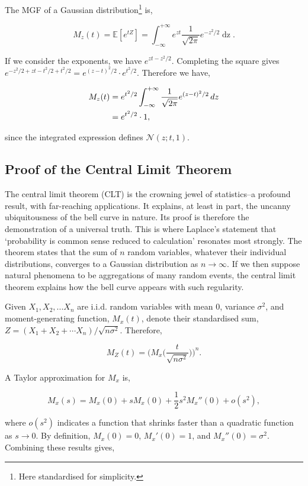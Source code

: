 \documentclass[11pt]{amsart}
\begin{document}
The MGF of a Gaussian distribution\footnote{Here standardised for simplicity.} is,

$$M_z(t) = \mathbb{E}[e^{tZ}] = \int_{-\infty}^{+\infty}e^{zt}\frac{1}{\sqrt{2\pi}}e^{-z^2/2}\mathop{dz}.$$

If we consider the exponents, we have $e^{zt - z^2/2}$. Completing the square gives $e^{-z^2/2 + zt - t^2/2 + t^2/2} = e^{(z-t)^2/2}\cdot e^{t^2/2}$. Therefore we have,

\begin{align}
M_z(t) &= e^{t^2/2}\int_{-\infty}^{+\infty}\frac{1}{\sqrt{2\pi}}e^{(z-t)^2/2}\mathop{dz} \notag \\
&= e^{t^2/2} \cdot 1, \notag
\end{align}

since the integrated expression defines $\mathcal{N}(z ; t, 1)$. 

\subsection{Proof of the Central Limit Theorem}

The central limit theorem (CLT) is the crowning jewel of statistics--a profound result, with far-reaching applications. It explains, at least in part, the uncanny ubiquitousness of the bell curve in nature. Its proof is therefore the demonstration of a universal truth. This is where Laplace's statement that `probability is common sense reduced to calculation' resonates most strongly. The theorem states that the sum of $n$ random variables, whatever their individual distributions, converges to a Gaussian distribution as $n \to \infty$. If we then suppose natural phenomena to be aggregations of many random events, the central limit theorem explains how the bell curve appears with such regularity.

Given $X_1, X_2, ... X_n$ are i.i.d. random variables with mean 0, variance $\sigma^2$, and moment-generating function, $M_x(t)$, denote their standardised sum, $Z = (X_1 + X_2 + \cdots X_n)/\sqrt{n\sigma^2}$. Therefore,

$$M_Z(t) = \Bigg(M_x\Bigg(\frac{t}{\sqrt{n\sigma^2}}\Bigg)\Bigg)^n.$$

A Taylor approximation for $M_x$ is,

$$M_x(s) = M_x(0) + sM_x(0) + \frac{1}{2}s^2M_x''(0) + o(s^2),$$

where $o(s^2)$ indicates a function that shrinks faster than a quadratic function as $s \to 0$. By definition, $M_x(0) = 0$, $M_x'(0) = 1$, and $M_x''(0) = \sigma^2$. Combining these results gives,
\end{document}
